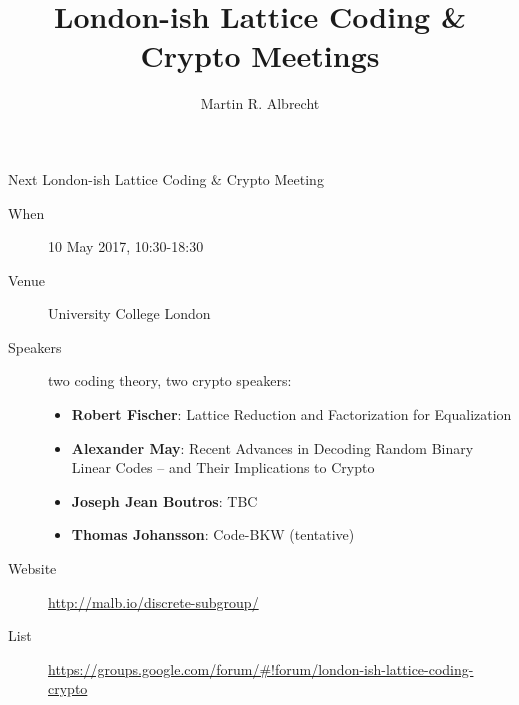 \documentclass[presentation,smaller]{beamer}
\author{Martin R. Albrecht}
\date{}
\title{London-ish Lattice Coding \& Crypto Meetings}
\renewcommand{\maketitle}{}
\begin{document}
\maketitle

\begin{frame}[label={sec:org972339c}]{Next London-ish Lattice Coding \& Crypto Meeting}
\begin{description}
\item[{When}] 10 May 2017, 10:30-18:30
\item[{Venue}] University College London
\item[{Speakers}] two coding theory, two crypto speakers:
\begin{itemize}
\item \textbf{Robert Fischer}: Lattice Reduction and Factorization for Equalization
\item \textbf{Alexander May}: Recent Advances in Decoding Random Binary Linear Codes – and Their Implications to Crypto
\item \textbf{Joseph Jean Boutros}: TBC
\item \textbf{Thomas Johansson}: Code-BKW (tentative)
\end{itemize}
\item[{Website}] \url{http://malb.io/discrete-subgroup/}
\item[{List}] \url{https://groups.google.com/forum/\#!forum/london-ish-lattice-coding-crypto}
\end{description}
\end{frame}
\end{document}
